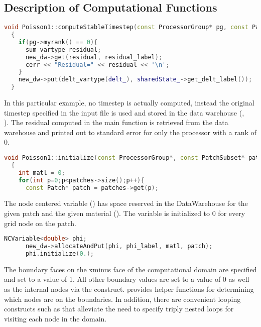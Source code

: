 \subsection{Description of Computational Functions}

\begin{lstlisting}[language=Cpp]
  void Poisson1::computeStableTimestep(const ProcessorGroup* pg, const PatchSubset* /*patches*/, const MaterialSubset* /*matls*/, DataWarehouse*, DataWarehouse* new_dw)
  {
    if(pg->myrank() == 0){
      sum_vartype residual;
      new_dw->get(residual, residual_label);
      cerr << "Residual=" << residual << '\n';
    }
    new_dw->put(delt_vartype(delt_), sharedState_->get_delt_label());
  }
\end{lstlisting}

In this particular example, no timestep is actually computed, instead
the original timestep specified in the input file is used and stored
in the data warehouse (,\\
  ).  The residual computed in the
main  function is retrieved from the data
warehouse and printed out to standard error for only the processor
with a rank of 0.

\begin{lstlisting}[language=Cpp]
  void Poisson1::initialize(const ProcessorGroup*, const PatchSubset* patches, const MaterialSubset* matls, DataWarehouse* /*old_dw*/, DataWarehouse* new_dw)
  {
    int matl = 0;
    for(int p=0;p<patches->size();p++){
      const Patch* patch = patches->get(p);
\end{lstlisting}

    The node centered variable () has space
    reserved in the DataWarehouse for the given patch and the given
    material ().  The  variable is
    initialized to 0 for every grid node on the patch.

\begin{lstlisting}[language=Cpp]
      NCVariable<double> phi;
      new_dw->allocateAndPut(phi, phi_label, matl, patch);
      phi.initialize(0.);
\end{lstlisting}

    The boundary faces on the xminus face of the computational domain are
    specified and set to a value of 1.  All other boundary values are set
    to a value of 0 as well as the internal nodes via the
     construct.  \Vaango provides helper
    functions for determining which nodes are on the boundaries.  In
    addition, there are convenient looping constructs such as
     that alleviate the need to specify triply nested
    loops for visiting each node in the domain.

